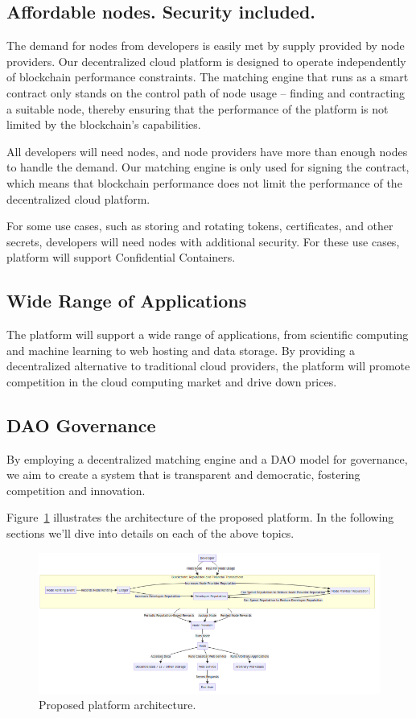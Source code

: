 \subsection{Affordable nodes. Security included.}

The demand for nodes from developers is easily met by supply provided by node providers. Our decentralized cloud platform is designed to operate independently of blockchain performance constraints. The matching engine that runs as a smart contract only stands on the control path of node usage -- finding and contracting a suitable node, thereby ensuring that the performance of the platform is not limited by the blockchain's capabilities.

All developers will need nodes, and node providers have more than enough nodes to handle the demand. Our matching engine is only used for signing the contract, which means that blockchain performance does not limit the performance of the decentralized cloud platform.

For some use cases, such as storing and rotating tokens, certificates, and other secrets, developers will need nodes with additional security. For these use cases, platform will support Confidential Containers\cite{brasser2022trusted}.

\subsection{Wide Range of Applications}

The platform will support a wide range of applications, from scientific computing and machine learning to web hosting and data storage. By providing a decentralized alternative to traditional cloud providers, the platform will promote competition in the cloud computing market and drive down prices.

\subsection{DAO Governance}

By employing a decentralized matching engine and a DAO model for governance, we aim to create a system that is transparent and democratic, fostering competition and innovation.


Figure~\ref{fig:proposed-architecture} illustrates the architecture of the proposed platform. In the following sections we'll dive into details on each of the above topics.


\begin{figure}[h]
    \centering
    \includegraphics[width=\textwidth]{figures/proposed_architecture.png}
    \caption{Proposed platform architecture.}
    \label{fig:proposed-architecture}
\end{figure}
